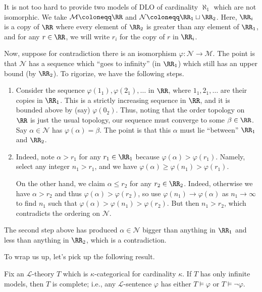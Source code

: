 \documentclass[../notes.tex]{subfiles}
\begin{document}
\begin{example}
	It is not too hard to provide two models of $\mathrm{DLO}$ of cardinality $\aleph_1$ which are not isomorphic. We take $\mathcal M\coloneqq\RR$ and $\mathcal N\coloneqq\RR_1\sqcup\RR_2$. Here, $\RR_i$ is a copy of $\RR$ where every element of $\RR_2$ is greater than any element of $\RR_1$, and for any $r\in\RR$, we will write $r_i$ for the copy of $r$ in $\RR_i$.
	
	Now, suppose for contradiction there is an isomorphism $\varphi\colon\mathcal N\to\mathcal M$. The point is that $\mathcal N$ has a sequence which ``goes to infinity'' (in $\RR_1$) which still has an upper bound (by $\RR_2$). To rigorize, we have the following steps.
	\begin{enumerate}
		\item Consider the sequence $\varphi(1_1),\varphi(2_1),\ldots$ in $\RR$, where $1_1,2_1,\ldots$ are their copies in $\RR_1$. This is a strictly increasing sequence in $\RR$, and it is bounded above by (say) $\varphi(0_2)$. Thus, noting that the order topology on $\RR$ is just the usual topology, our sequence must converge to some $\beta\in\RR$. Say $\alpha\in\mathcal N$ has $\varphi(\alpha)=\beta$. The point is that this $\alpha$ must lie ``between'' $\RR_1$ and $\RR_2$.
		\item Indeed, note $\alpha>r_1$ for any $r_1\in\RR_1$ because $\varphi(\alpha)>\varphi(r_1)$. Namely, select any integer $n_1>r_1$, and we have $\varphi(\alpha)\ge\varphi(n_1)>\varphi(r_1)$.

		On the other hand, we claim $\alpha\le r_2$ for any $r_2\in\RR_2$. Indeed, otherwise we have $\alpha>r_2$ and thus $\varphi(\alpha)>\varphi(r_2)$, so use $\varphi(n_1)\to\varphi(\alpha)$ as $n_1\to\infty$ to find $n_1$ such that $\varphi(\alpha)>\varphi(n_1)>\varphi(r_2)$. But then $n_1>r_2$, which contradicts the ordering on $\mathcal N$.
	\end{enumerate}
	The second step above has produced $\alpha\in\mathcal N$ bigger than anything in $\RR_1$ and less than anything in $\RR_2$, which is a contradiction.
\end{example}
To wrap us up, let's pick up the following result.
\begin{proposition} \label{prop:kappa-categorical-is-complete}
	Fix an $\mathcal L$-theory $T$ which is $\kappa$-categorical for cardinality $\kappa$. If $T$ has only infinite models, then $T$ is complete; i.e., any $\mathcal L$-sentence $\varphi$ has either $T\models\varphi$ or $T\models\lnot\varphi$.
\end{proposition}
\end{document}

